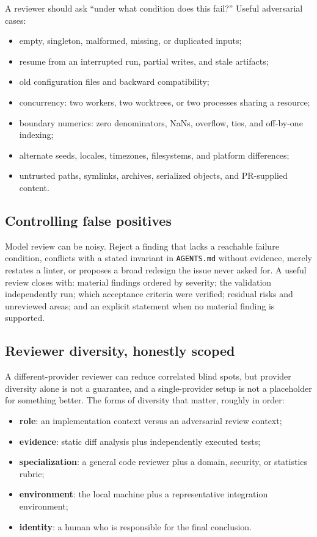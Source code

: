 \documentclass[11pt]{article}
\newcommand{\co}[1]{\lstinline[basicstyle=\ttfamily\color{gwInk}]{#1}}
\begin{document}
A reviewer should ask ``under what condition does this fail?'' Useful adversarial cases:

\begin{itemize}
  \item empty, singleton, malformed, missing, or duplicated inputs;
  \item resume from an interrupted run, partial writes, and stale artifacts;
  \item old configuration files and backward compatibility;
  \item concurrency: two workers, two worktrees, or two processes sharing a resource;
  \item boundary numerics: zero denominators, NaNs, overflow, ties, and off-by-one indexing;
  \item alternate seeds, locales, timezones, filesystems, and platform differences;
  \item untrusted paths, symlinks, archives, serialized objects, and PR-supplied content.
\end{itemize}

\subsection{Controlling false positives}

Model review can be noisy. Reject a finding that lacks a reachable failure condition, conflicts
with a stated invariant in \co{AGENTS.md} without evidence, merely restates a linter, or proposes
a broad redesign the issue never asked for. A useful review closes with: material findings
ordered by severity; the validation independently run; which acceptance criteria were verified;
residual risks and unreviewed areas; and an explicit statement when no material finding is
supported.

\subsection{Reviewer diversity, honestly scoped}

A different-provider reviewer can reduce correlated blind spots, but provider diversity alone is
not a guarantee, and a single-provider setup is not a placeholder for something better. The forms
of diversity that matter, roughly in order:

\begin{itemize}
  \item \textbf{role}: an implementation context versus an adversarial review context;
  \item \textbf{evidence}: static diff analysis plus independently executed tests;
  \item \textbf{specialization}: a general code reviewer plus a domain, security, or statistics
    rubric;
  \item \textbf{environment}: the local machine plus a representative integration environment;
  \item \textbf{identity}: a human who is responsible for the final conclusion.
\end{itemize}
\end{document}
